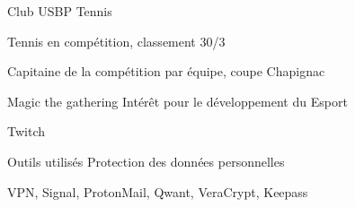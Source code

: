 

\begin{cventries}

  \cventry
    {Club USBP} %
    {Tennis} %
    {} %
    {} %
    {
      \begin{cvitems} %
        \item {Tennis en compétition, classement 30/3}
        \item {Capitaine de la compétition par équipe, coupe Chapignac}
      \end{cvitems}
    }

  \cventry
    {Magic the gathering} %
    {Intérêt pour le développement du Esport} %
    {} %
    {} %
    {
      \begin{cvitems} %
        \item {Twitch}
      \end{cvitems}
    }

  \cventry
    {Outils utilisés} %
    {Protection des données personnelles} %
    {} %
    {} %
    {
      \begin{cvitems} %
        \item {VPN, Signal, ProtonMail, Qwant, VeraCrypt, Keepass}
      \end{cvitems}
    }

\end{cventries}
